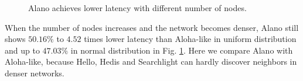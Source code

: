 \begin{figure}[!t]
\centering
{}
\hspace{0.01in}
\caption{Alano achieves lower latency with different number of nodes.}
\label{fig_node}
\end{figure}

When the number of nodes increases and the network becomes denser, Alano still shows $50.16\%$ to $4.52$ times lower latency than Aloha-like in uniform distribution and up to $47.03\%$ in normal distribution in Fig. \ref{fig_node}. Here we compare Alano with Aloha-like, because Hello, Hedis and Searchlight can hardly discover neighbors in denser networks. 



